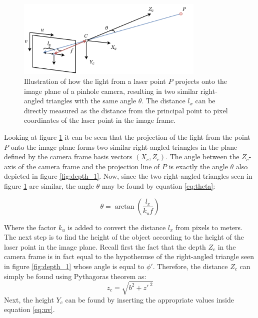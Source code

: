 \begin{figure}[h]
    \centering
    \includegraphics[width=0.8\textwidth]{figures/reconstruction/lxfig.pdf}
    \caption{Illustration of how the light from a laser point $P$ projects onto the image plane of a pinhole camera, resulting in two similar right-angled triangles with the same angle $\theta$. The distance $l_{x}$ can be directly measured as the distance from the principal point to pixel coordinates of the laser point in the image frame.}
    \label{fig:lxfig}
\end{figure}

Looking at figure \ref{fig:lxfig} it can be seen that the projection of the light from the point $P$ onto the image plane forms two similar right-angled triangles in the plane defined by the camera frame basis vectors $(X_{c}, Z_{c})$. The angle between the $Z_{c}$-axis of the camera frame and the projection line of $P$ is exactly the angle $\theta$ also depicted in figure \ref{fig:depth_1}. Now, since the two right-angled triangles seen in figure \ref{fig:lxfig} are similar, the angle $\theta$ may be found by equation \ref{eq:theta}:

\begin{equation}
\label{eq:theta}
    \theta = \arctan\left(\frac{l_{x} }{k_{u} f}\right)
\end{equation}

Where the factor $k_{u}$ is added to convert the distance $l_{x}$ from pixels to meters.\\

The next step is to find the height of the object according to the height of the laser point in the image plane. Recall first the fact that the depth $Z_{c}$ in the camera frame is in fact equal to the hypothenuse of the right-angled triangle seen in figure \ref{fig:depth_1} whose angle is equal to $\phi'$. Therefore, the distance $Z_{c}$ can simply be found using Pythagoras theorem as:
\begin{equation}
\label{eq:pythagoran_zc}
    z_{c} = \sqrt{b^{2} + z'^{\;2}}
\end{equation}
Next, the height $Y_{c}$ can be found by inserting the appropriate values inside equation \ref{eq:uv}.\\

